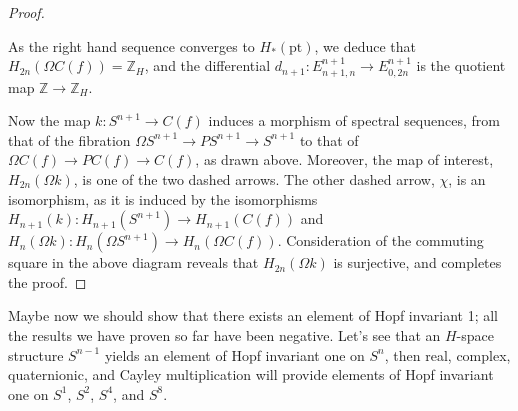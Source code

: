 \documentclass{article}
\newcommand{\Z}{\mathbb{Z}}
\newcommand{\ptspace}{\mathrm{pt}}
\newcommand{\Loops}{\Omega}
\renewcommand{\to}{\longrightarrow}
\theoremstyle{definition}
\begin{document}
\begin{proof}
\begin{center}
\end{center}
As the right hand sequence converges to $H_*(\ptspace)$, we deduce that $H_{2n}(\Omega C(f))=\Z_H$, and the differential $d_{n+1}:E^{n+1}_{n+1,n}\to E^{n+1}_{0,2n}$ is the quotient map $\Z\to\Z_H$. 

Now the map $k:S^{n+1}\to C(f)$ induces a morphism of spectral sequences,  from that of the fibration $\Loops S^{n+1} \to PS^{n+1} \to S^{n+1}$ to that of $\Loops C(f) \to PC(f) \to C(f)$, as drawn above. Moreover, the map of interest, $H_{2n}(\Omega k)$, is one of the two dashed arrows. The other dashed arrow, $\chi$, is an isomorphism, as it is induced by the isomorphisms $H_{n+1}(k):H_{n+1}(S^{n+1})\to H_{n+1}(C(f))$ and $H_{n}(\Omega k):H_n(\Omega S^{n+1})\to H_n(\Omega C(f))$. Consideration of the commuting square in the above diagram reveals that $H_{2n}(\Omega k)$ is surjective, and completes the proof.
\end{proof}

Maybe now we should show that there exists an element of Hopf invariant 1; all the results we have proven so far have been negative.  Let's see that an $H$-space structure $S^{n-1}$ yields an element of Hopf invariant one on $S^n$, then real, complex, quaternionic, and Cayley multiplication will provide elements of Hopf invariant one on $S^1$, $S^2$, $S^4$, and $S^8$.
\end{document}
